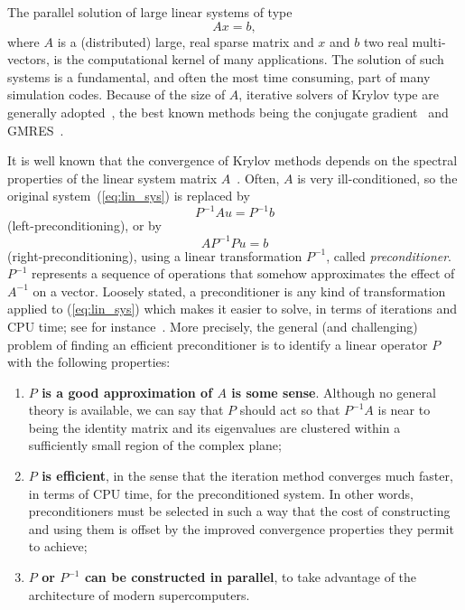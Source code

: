 \documentclass{article}[11pt]
\begin{document}
The parallel solution of large linear systems of type
\begin{equation}
\label{eq:lin_sys}
A {x} = {b},
\end{equation}
where $A$ is a (distributed) large, real sparse matrix and $x$ and $b$ two real
multi-vectors, is the computational kernel of many applications. The solution
of such systems is a fundamental, and often the most time consuming,
  part of many simulation codes. Because of
the size of $A$, iterative solvers of Krylov type are generally
adopted~\cite{barret93templates}, the
best known methods being the conjugate gradient~\cite{hestenes52method} and
GMRES~\cite{saad86gmres}.
  
It is well known that the convergence of Krylov methods depends on 
the spectral properties of the linear system matrix
$A$~\cite{axelsson94iterative,saad96iterative,QSS}. Often, $A$ is very
ill-conditioned, so the
original system~(\ref{eq:lin_sys}) is replaced by
\[
P^{-1} A{u} = P^{-1} {b}
\]
(left-preconditioning), or by
\[
A P^{-1} P {u} = {b}
\]
(right-preconditioning), using a linear transformation $P^{-1}$,
called {\sl preconditioner}. $P^{-1}$ represents a sequence of operations
that somehow approximates the effect of $A^{-1}$ on a vector. 
Loosely stated, a preconditioner is any
kind of transformation applied to (\ref{eq:lin_sys}) which makes it
easier to solve, in terms of iterations and CPU time; see for
instance~\cite{greenbaum97iterative,golub97closer,vorst95parallel}. More precisely,
the general (and challenging) problem of finding an efficient
preconditioner is to identify a linear operator $P$ with the following
properties:
\begin{enumerate}
\item {\bf $P$ is a good approximation of $A$ is some sense}. Although no
  general theory is available, we can say that $P$ should act so that
  $P^{-1} A$ is near to being the identity matrix and its eigenvalues
  are clustered within a sufficiently small region of the complex plane;
\item {\bf $P$ is efficient}, in the sense that the iteration method converges
  much faster, in terms of CPU time, for the preconditioned system.  In
  other words, preconditioners must be selected in such a way that the
  cost of constructing and using them is offset by the improved
  convergence properties they permit to achieve;
\item {\bf $P$ or $P^{-1}$ can be constructed in parallel}, to take advantage of the architecture of modern supercomputers.
\end{enumerate}
\end{document}
